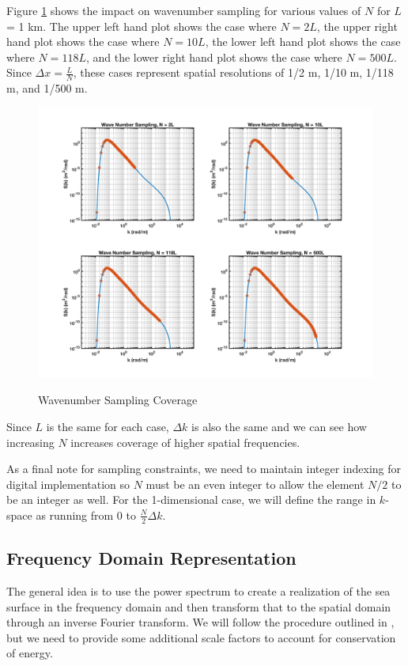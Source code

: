 Figure \ref{os_fig:6aa} shows the impact on wavenumber sampling for various values of $N$ for $L$ = 1 km. The upper left hand plot shows the case where $N = 2L$, the upper right hand plot shows the case where $N = 10L$, the lower left hand plot shows the case where $N = 118L$, and the lower right hand plot shows the case where $N = 500L$. Since $\Delta x = \frac{L}{N}$, these cases represent spatial resolutions of 1/2 m, 1/10 m, 1/118 m, and 1/500 m. 
\begin{figure}[H]
  \begin{center}
\includegraphics[width=6in]{../media/Ocean_Surface/sampling_coverage.png}
  \end{center}
  \renewcommand{\baselinestretch}{1} \small\normalsize
  \begin{quote}
    \caption[Wavenumber Sampling Coverage]{Wavenumber Sampling Coverage\label{os_fig:6aa}}
  \end{quote}
\end{figure}
\renewcommand{\baselinestretch}{2} \small\normalsize
Since $L$ is the same for each case, $\Delta k$ is also the same and we can see how increasing $N$ increases coverage of higher spatial frequencies.

As a final note for sampling constraints, we need to maintain integer indexing for digital implementation so $N$ must be an even integer to allow the element $N/2$ to be an integer as well. For the 1-dimensional case, we will define the range in $k$-space as running from $0$ to $\frac{N}{2}\Delta k$.

\subsection{Frequency Domain Representation}
The general idea is to use the power spectrum to create a realization of the sea surface in the frequency domain and then transform that to the spatial domain through an inverse Fourier transform. We will follow the procedure outlined in \cite{percival_spectra}, 
but we need to provide some additional scale factors to account for conservation of energy.


